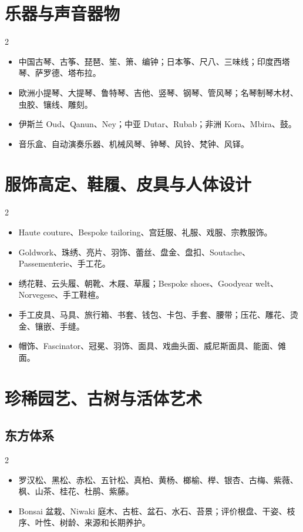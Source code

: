 \documentclass[lang=en,a4paper,11pt]{elegantpaper}
\begin{document}
\section{乐器与声音器物}


\begin{multicols}{2}
\begin{itemize}
\item 中国古琴、古筝、琵琶、笙、箫、编钟；日本筝、尺八、三味线；印度西塔琴、萨罗德、塔布拉。
\item 欧洲小提琴、大提琴、鲁特琴、吉他、竖琴、钢琴、管风琴；名琴制琴木材、虫胶、镶线、雕刻。
\item 伊斯兰 Oud、Qanun、Ney；中亚 Dutar、Rubab；非洲 Kora、Mbira、鼓。
\item 音乐盒、自动演奏乐器、机械风琴、钟琴、风铃、梵钟、风铎。
\end{itemize}
\end{multicols}

\section{服饰高定、鞋履、皮具与人体设计}


\begin{multicols}{2}
\begin{itemize}
\item Haute couture、Bespoke tailoring、宫廷服、礼服、戏服、宗教服饰。
\item Goldwork、珠绣、亮片、羽饰、蕾丝、盘金、盘扣、Soutache、Passementerie、手工花。
\item 绣花鞋、云头履、朝靴、木屐、草履；Bespoke shoes、Goodyear welt、Norvegese、手工鞋楦。
\item 手工皮具、马具、旅行箱、书套、钱包、卡包、手套、腰带；压花、雕花、烫金、镶嵌、手缝。
\item 帽饰、Fascinator、冠冕、羽饰、面具、戏曲头面、威尼斯面具、能面、傩面。
\end{itemize}
\end{multicols}

\section{珍稀园艺、古树与活体艺术}


\subsection{东方体系}


\begin{multicols}{2}
\begin{itemize}
\item 罗汉松、黑松、赤松、五针松、真柏、黄杨、榔榆、榉、银杏、古梅、紫薇、枫、山茶、桂花、杜鹃、紫藤。
\item Bonsai 盆栽、Niwaki 庭木、古桩、盆石、水石、苔景；评价根盘、干姿、枝序、叶性、树龄、来源和长期养护。
\end{itemize}
\end{multicols}
\end{document}

